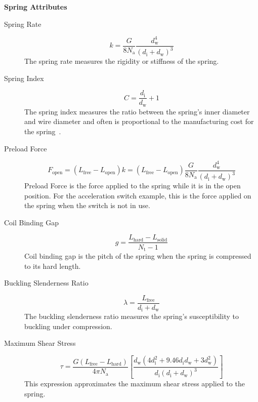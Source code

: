 \documentclass[10pt]{article}
\begin{document}
		\begin{center}\textbf{Spring Attributes}\end{center}
			\begin{description}
			
				\item [Spring Rate] \begin{equation} k = \frac{G}{8N_{\text{a}}}\frac{d_{\text{w}}^{4}}{(d_{\text{i}} + d_{\text{w}})^{3}}\end{equation}
				The spring rate measures the rigidity or stiffness of the spring. 
			
			\item[Spring Index]\begin{equation}C = \frac{d_{\text{i}}}{d_{\text{w}}} + 1\end{equation}
				The spring index measures the ratio between the spring's inner diameter and wire diameter and often is proportional to the manufacturing cost for the spring~\cite{SpringIndex}.
			
			\item[Preload Force]\begin{equation*} F_{\text{open}} = (L_{\text{free}}-L_{\text{open}})k = (L_{\text{free}}-L_{\text{open}})\frac{G}{8N_{\text{a}}}\frac{d_{\text{w}}^{4}}{(d_{\text{i}} + d_{\text{w}})^{3}} \end{equation*}
				Preload Force is the force applied to the spring while it is in the open position. For the acceleration switch example, this is the force applied on the spring when the switch is not in use.  
				
			\item[Coil Binding Gap]\begin{equation} g = \frac{L_{\text{hard}} - L_{\text{solid}}}{N_{\text{t}} - 1}\end{equation}		
				Coil binding gap is the pitch of the spring when the spring is compressed to its hard length. 
			 
			 \item[Buckling Slenderness Ratio]\begin{equation*} \lambda = \frac{L_{\text{free}}}{d_{\text{i}} + d_{\text{w}}} \end{equation*}
			 	The buckling slenderness ratio measures the spring's susceptibility to buckling under compression.
			 
			 \item[Maximum Shear Stress]\begin{equation} \tau = \frac{G(L_{\text{free}} - L_{\text{hard}})}{4 \pi N_{\text{a}}} \left[\frac{d_{\text{w}} (4d_{\text{i}}^{2} + 9.46d_{\text{i}} 
d_{\text{w}} + 3 d_{\text{w}}^{2})}{d_{\text{i}}(d_{\text{i}}+d_{\text{w}})^{3}}\right]\end{equation}
				This expression approximates the maximum shear stress applied to the spring. 
			

\end{description}
\end{document}
